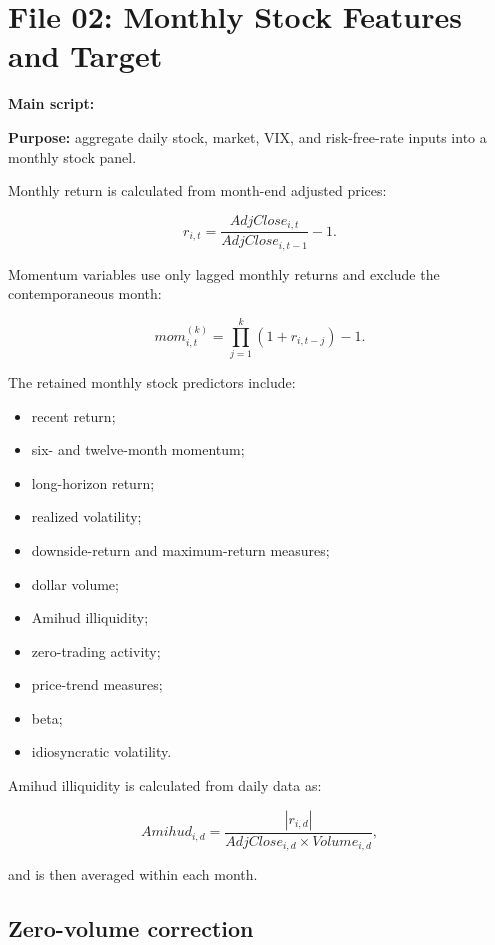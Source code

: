 \documentclass[11pt,a4paper]{article}
\begin{document}
\section{File 02: Monthly Stock Features and Target}

\textbf{Main script:}

\begin{center}
\end{center}

\textbf{Purpose:} aggregate daily stock, market, VIX, and risk-free-rate inputs
into a monthly stock panel.

Monthly return is calculated from month-end adjusted prices:

\[
  r_{i,t}
  =
  \frac{AdjClose_{i,t}}
       {AdjClose_{i,t-1}}
  -1.
\]

Momentum variables use only lagged monthly returns and exclude the
contemporaneous month:

\[
  mom_{i,t}^{(k)}
  =
  \prod_{j=1}^{k}
  (1+r_{i,t-j})-1.
\]

The retained monthly stock predictors include:

\begin{itemize}
  \item recent return;
  \item six- and twelve-month momentum;
  \item long-horizon return;
  \item realized volatility;
  \item downside-return and maximum-return measures;
  \item dollar volume;
  \item Amihud illiquidity;
  \item zero-trading activity;
  \item price-trend measures;
  \item beta;
  \item idiosyncratic volatility.
\end{itemize}

Amihud illiquidity is calculated from daily data as:

\[
  Amihud_{i,d}
  =
  \frac{|r_{i,d}|}
  {AdjClose_{i,d}\times Volume_{i,d}},
\]

and is then averaged within each month.

\subsection{Zero-volume correction}
\end{document}
